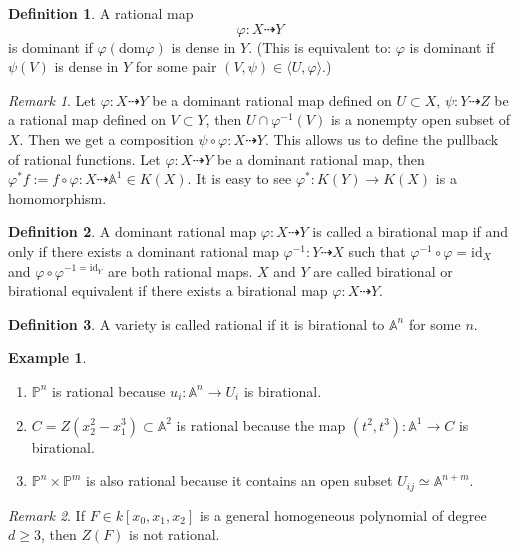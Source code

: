 \documentclass{amsart}
\theoremstyle{plain}
\theoremstyle{definition}
\newtheorem{definition}{Definition}
\newtheorem{example}{Example}
\theoremstyle{remark}
\newtheorem*{remark}{Remark}
\numberwithin{equation}{section}
\begin{document}
\begin{definition}
	A rational map $$
		\varphi:X\dashrightarrow Y
	$$
	is dominant if $ \varphi(\text{dom}\varphi) $ is dense in $ Y $. (This is equivalent to: $ \varphi $ is dominant if $ \psi(V) $ is dense in $ Y $ for some pair $ (V,\psi)\in\langle U,\varphi\rangle $.)
\end{definition}
\begin{remark}
		Let $ \varphi:X\dashrightarrow Y $  be a dominant rational map defined on $ U\subset X $, $ \psi:Y\dashrightarrow Z $ be a rational map defined on $ V\subset Y $, then $ U\cap \varphi^{-1}(V) $ is a nonempty open subset of $ X $. Then we get a composition $ \psi\circ\varphi:X\dashrightarrow Y $. This allows us to define the pullback of rational functions. Let $ \varphi:X\dashrightarrow Y $ be a dominant rational map, then $ \varphi^\ast f:=f\circ\varphi :X\dashrightarrow \mathbb{A}^1\in K(X)$. It is easy to see $ \varphi^\ast:K(Y)\to K(X) $ is a homomorphism. 
\end{remark}
\begin{definition}
	A dominant rational map $ \varphi:X\dashrightarrow Y $ is called a birational map if and only if there exists a dominant rational map $ \varphi^{-1}:Y\dashrightarrow X $ such that $ \varphi^{-1}\circ \varphi=\text{id}_X $ and $ \varphi\circ\varphi^{-1=\text{id}_Y} $ are both rational maps. $ X $ and $ Y $ are called birational or birational equivalent if there exists a birational map $ \varphi:X\dashrightarrow Y $.
\end{definition}
\begin{definition}
	A variety is called rational if it is birational to $ \mathbb{A}^n $ for some $ n $.
\end{definition}
\begin{example}
	\noindent\begin{enumerate}
		\item $ \mathbb{P}^n $ is rational because $ u_i:\mathbb{A}^n\to U_i $ is birational.
		\item $ C=Z(x_2^2-x_1^3)\subset \mathbb{A}^2 $ is rational because the map $ (t^2,t^3): \mathbb{A}^1\to C $ is birational.
		\item $ \mathbb{P}^n\times\mathbb{P}^m $ is also rational because it contains an open subset $ U_{ij}\simeq \mathbb{A}^{n+m} $.
	\end{enumerate}
\end{example}
\begin{remark}
	If $ F\in k [x_0,x_1,x_2] $ is a general homogeneous polynomial of degree $ d\geq 3 $, then $ Z(F) $ is not rational.
\end{remark}


\end{document}
